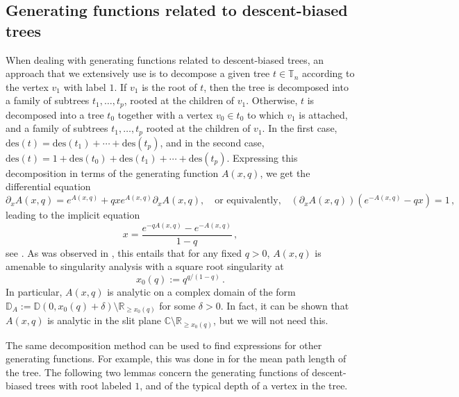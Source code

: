 \documentclass{article}
\theoremstyle{remark}
\newcommand{\bR}{\mathbb{R}}
\newcommand{\bC}{\mathbb{C}}
\newcommand{\bT}{\mathbb{T}}
\newcommand{\bD}{\mathbb{D}}
\newcommand{\des}[1]{{\mathrm{des}{\left(#1\right)}}}
\begin{document}
\subsection{Generating functions related to descent-biased trees}
\label{sec: Generating functions related to descent-biased trees}

When dealing with generating functions related to descent-biased trees, an approach that we extensively use is to decompose a given tree $t\in \bT_n$ according to the vertex $v_1$ with label $1$.
If $v_1$ is the root of $t$, then the tree is decomposed into a family of subtrees $t_1, \dots, t_p$, rooted at the children of $v_1$.
Otherwise, $t$ is decomposed into a tree $t_0$ together with a vertex $v_0\in t_0$ to which $v_1$ is attached, and a family of subtrees $t_1, \dots, t_p$ rooted at the children of $v_1$.
In the first case, $\des{t} = \des{t_1} + \cdots + \des{t_p}$, and in the second case, $\des{t} = 1 + \des{t_0} + \des{t_1} + \cdots + \des{t_p}$.
Expressing this decomposition in terms of the generating function $A(x,q)$, we get the differential equation
\begin{equation}\label{eq: differential equation for A}
    \partial_x A(x,q) = e^{A(x,q)} + q x e^{A(x,q)} \partial_x A(x,q) ,
    \quad\text{or equivalently,}\quad
    (\partial_x A(x,q)) ( e^{-A(x,q)} - qx ) = 1 \,,
\end{equation}
leading to the implicit equation 
\begin{equation}\label{eq: implicit equation for A}
    x = \frac{e^{-q A(x,q)} - e^{-A(x,q)}}{1-q} \,,
\end{equation}
see \cite{Thevenin_Wagner_2023}.
As was observed in \cite[Lemma~21]{Thevenin_Wagner_2023}, this entails that for any fixed $q>0$, $A(x,q)$ is amenable to singularity analysis with a square root singularity at 
\begin{equation}
    x_0(q) := q^{q/(1-q)} \,.
\end{equation}
In particular, $A(x,q)$ is analytic on a complex domain of the form $\bD_A := \bD(0,x_0(q)+\delta) \setminus \bR_{\ge x_0(q)}$ for some $\delta>0$. In fact, it can be shown that $A(x,q)$ is analytic in the slit plane $\bC \setminus \bR_{\ge x_0(q)}$, but we will not need this.

The same decomposition method can be used to find expressions for other generating functions.
For example, this was done in \cite[Section~6.3]{Thevenin_Wagner_2023} for the mean path length of the tree.
The following two lemmas concern the generating functions of descent-biased trees with root labeled $1$, and of the typical depth of a vertex in the tree.
\end{document}
